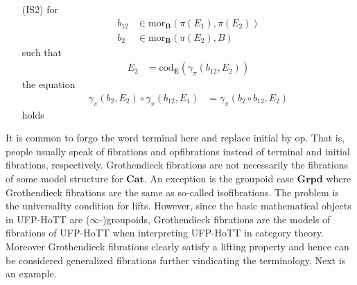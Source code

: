 \begin{enumerate}
\begin{enumerate}
\item[(IS2)]
for
\begin{align*}
  b_{12}
  &\in
  \mathrm{mor}_{\mathbf{B}}
  \left(
    \pi(E_{1}),
    \pi(E_{2})
  \right)
  \\
  b_{2}
  &\in
  \mathrm{mor}_{\mathbf{B}}
  \left(
    \pi(E_{2}),
    B
  \right)
\end{align*}
such that
\begin{align*}
  E_{2}
  &=
  \mathrm{cod}_{\mathbf{E}}
  \left(
    \gamma_{\pi}(b_{12},E_{2})
  \right)
\end{align*}
the equation
\begin{align*}
  \gamma_{\pi}(b_{2},E_{2})
  \circ
  \gamma_{\pi}(b_{12},E_{1})
  &=
  \gamma_{\pi}(b_{2} \circ b_{12},E_{2})
\end{align*}
holds
\end{enumerate}
\end{enumerate}
It is common to forgo the word {\glqq}terminal{\grqq} here and replace {\glqq}initial{\grqq} by {\glqq}op{\grqq}. That is, people usually speak of fibrations and opfibrations instead of terminal and initial fibrations, respectively. Grothendieck fibrations are not necessarily the fibrations of some model structure for $\mathbf{Cat}$. An exception is the groupoid case $\mathbf{Grpd}$ where Grothendieck fibrations are the same as so-called isofibrations. The problem is the universality condition for lifts. However, since the basic mathematical objects in UFP-HoTT are ($\infty$-)groupoids, Grothendieck fibrations are the models of fibrations of UFP-HoTT when interpreting UFP-HoTT in category theory. Moreover Grothendieck fibrations clearly satisfy a lifting property and hence can be considered generalized fibrations further vindicating the terminology. Next is an example.
\\
